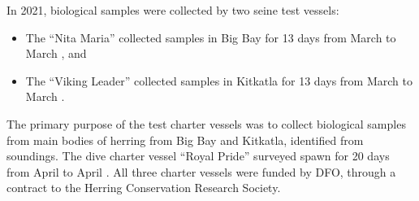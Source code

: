 In 2021, biological samples were collected by two seine test vessels:
\begin{itemize}
\item The ``Nita Maria'' collected samples in Big Bay for 13 days from March  to March , and
\item The ``Viking Leader'' collected samples in Kitkatla for 13 days from March  to March .
\end{itemize}
The primary purpose of the test charter vessels was to collect biological samples
from main bodies of herring from Big Bay and Kitkatla, identified from soundings.
The dive charter vessel ``Royal Pride'' surveyed spawn for 20 days from April  to April .
All three charter vessels were funded by DFO, through a contract to the Herring Conservation Research Society.
